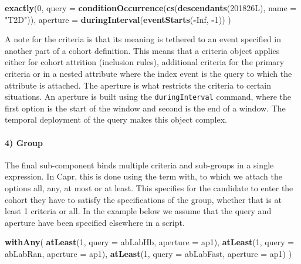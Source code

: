 \documentclass[
]{article}
\newenvironment{Shaded}{\begin{snugshade}}{\end{snugshade}}
\newcommand{\AttributeTok}[1]{\textcolor[rgb]{0.13,0.29,0.53}{#1}}
\newcommand{\ConstantTok}[1]{\textcolor[rgb]{0.56,0.35,0.01}{#1}}
\newcommand{\DataTypeTok}[1]{\textcolor[rgb]{0.13,0.29,0.53}{#1}}
\newcommand{\DecValTok}[1]{\textcolor[rgb]{0.00,0.00,0.81}{#1}}
\newcommand{\FunctionTok}[1]{\textcolor[rgb]{0.13,0.29,0.53}{\textbf{#1}}}
\newcommand{\NormalTok}[1]{#1}
\newcommand{\SpecialCharTok}[1]{\textcolor[rgb]{0.81,0.36,0.00}{\textbf{#1}}}
\newcommand{\StringTok}[1]{\textcolor[rgb]{0.31,0.60,0.02}{#1}}
\begin{document}
\begin{Shaded}
\begin{Highlighting}[]
\FunctionTok{exactly}\NormalTok{(}\DecValTok{0}\NormalTok{, }
  \AttributeTok{query =} \FunctionTok{conditionOccurrence}\NormalTok{(}\FunctionTok{cs}\NormalTok{(}\FunctionTok{descendants}\NormalTok{(}\DecValTok{201826}\DataTypeTok{L}\NormalTok{), }\AttributeTok{name =} \StringTok{"T2D"}\NormalTok{)),}
        \AttributeTok{aperture =} \FunctionTok{duringInterval}\NormalTok{(}\FunctionTok{eventStarts}\NormalTok{(}\SpecialCharTok{{-}}\ConstantTok{Inf}\NormalTok{, }\SpecialCharTok{{-}}\DecValTok{1}\NormalTok{))}
\NormalTok{        )}
\end{Highlighting}
\end{Shaded}

A note for the criteria is that its meaning is tethered to an event
specified in another part of a cohort definition. This means that a
criteria object applies either for cohort attrition (inclusion rules),
additional criteria for the primary criteria or in a nested attribute
where the index event is the query to which the attribute is attached.
The aperture is what restricts the criteria to certain situations. An
aperture is built using the \texttt{duringInterval} command, where the
first option is the start of the window and second is the end of a
window. The temporal deployment of the query makes this object complex.

\paragraph{4) Group}\label{group}

The final sub-component binds multiple criteria and sub-groups in a
single expression. In Capr, this is done using the term with, to which
we attach the options all, any, at most or at least. This specifies for
the candidate to enter the cohort they have to satisfy the
specifications of the group, whether that is at least 1 criteria or all.
In the example below we assume that the query and aperture have been
specified elsewhere in a script.

\begin{Shaded}
\begin{Highlighting}[]
\FunctionTok{withAny}\NormalTok{(}
  \FunctionTok{atLeast}\NormalTok{(}\DecValTok{1}\NormalTok{, }\AttributeTok{query =}\NormalTok{ abLabHb, }\AttributeTok{aperture =}\NormalTok{ ap1),}
  \FunctionTok{atLeast}\NormalTok{(}\DecValTok{1}\NormalTok{, }\AttributeTok{query =}\NormalTok{ abLabRan, }\AttributeTok{aperture =}\NormalTok{ ap1),}
  \FunctionTok{atLeast}\NormalTok{(}\DecValTok{1}\NormalTok{, }\AttributeTok{query =}\NormalTok{ abLabFast, }\AttributeTok{aperture =}\NormalTok{ ap1)}
\NormalTok{)}
\end{Highlighting}
\end{Shaded}
\end{document}
